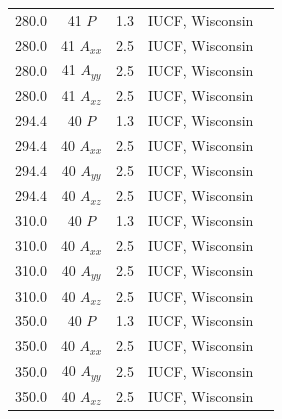 \begin{table}
\begin{tabular}{lcccr}
280.0 & 41 $P$ & 1.3 &  IUCF, Wisconsin & \cite{Pr98} \\
280.0 & 41 $A_{xx}$ & 2.5 &  IUCF, Wisconsin & \cite{Pr98} \\
280.0 & 41 $A_{yy}$ & 2.5 &  IUCF, Wisconsin & \cite{Pr98} \\
280.0 & 41 $A_{xz}$ & 2.5 &  IUCF, Wisconsin & \cite{Pr98} \\
294.4 & 40 $P$ & 1.3 &  IUCF, Wisconsin & \cite{Pr98} \\
294.4 & 40 $A_{xx}$ & 2.5 &  IUCF, Wisconsin & \cite{Pr98} \\
294.4 & 40 $A_{yy}$ & 2.5 &  IUCF, Wisconsin & \cite{Pr98} \\
294.4 & 40 $A_{xz}$ & 2.5 &  IUCF, Wisconsin & \cite{Pr98} \\
310.0 & 40 $P$ & 1.3 &  IUCF, Wisconsin & \cite{Pr98} \\
310.0 & 40 $A_{xx}$ & 2.5 &  IUCF, Wisconsin & \cite{Pr98} \\
310.0 & 40 $A_{yy}$ & 2.5 &  IUCF, Wisconsin & \cite{Pr98} \\
310.0 & 40 $A_{xz}$ & 2.5 &  IUCF, Wisconsin & \cite{Pr98} \\
350.0 & 40 $P$ & 1.3 &  IUCF, Wisconsin & \cite{Pr98} \\
350.0 & 40 $A_{xx}$ & 2.5 &  IUCF, Wisconsin & \cite{Pr98} \\
350.0 & 40 $A_{yy}$ & 2.5 &  IUCF, Wisconsin & \cite{Pr98} \\
350.0 & 40 $A_{xz}$ & 2.5 &  IUCF, Wisconsin & \cite{Pr98} \\
\end{tabular}
\label{tab_ppdat}
\end{table}


\pagebreak



